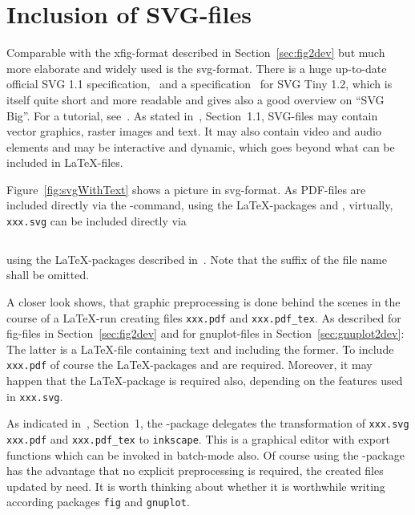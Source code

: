 \section{Inclusion of SVG-files}\label{sec:picSvg}

Comparable with the xfig-format described in Section~\ref{sec:fig2dev} 
but much more elaborate and widely used is the \gls{svg}-format. 
There is a huge up-to-date official SVG 1.1 specification,~\cite{Svg11} 
and a specification~\cite{Svg12Tiny} for SVG Tiny 1.2, 
which is itself quite short and more readable 
and gives also a good overview on ``SVG Big''. 
For a tutorial, see~\cite{SvgTut}. 
As stated in~\cite{Svg12Tiny}, Section~1.1, 
SVG-files may contain vector graphics, raster images and text. 
It may also contain video and audio elements 
and may be interactive and dynamic, 
which goes beyond what can be included in \LaTeX-files. 

Figure~\ref{fig:svgWithText} shows a picture in \gls{svg}-format. 
As PDF-files are included directly 
via the -command, 
using the \LaTeX-packages  and , 
virtually, 
\texttt{xxx.svg} can be included directly via 
\begin{lstlisting}[language=TeX]
%%
\end{lstlisting}
%
using the \LaTeX-packages  described in~\cite{SvgP}. 
Note that the suffix of the file name shall be omitted. 

A closer look shows, that graphic preprocessing is done behind the scenes 
in the course of a \LaTeX-run 
creating files \texttt{xxx.pdf} and \texttt{xxx.pdf\_tex}. 
As described for fig-files in Section~\ref{sec:fig2dev} 
and for gnuplot-files in Section~\ref{sec:gnuplot2dev}: 
The latter is a \LaTeX-file containing text 
and including the former. 
To include \texttt{xxx.pdf} 
of course the \LaTeX-packages  and  
are required. 
Moreover, it may happen that the \LaTeX-package  
is required also, depending on the features used in \texttt{xxx.svg}. 

As indicated in~\cite{SvgP}, Section~1, 
the -package delegates the transformation 
of \texttt{xxx.svg} \texttt{xxx.pdf} and \texttt{xxx.pdf\_tex} 
to \texttt{inkscape}. 
This is a graphical editor with export functions 
which can be invoked in batch-mode also. 
Of course using the -package has the advantage 
that no explicit preprocessing is required, 
the created files updated by need. 
It is worth thinking about whether it is worthwhile 
writing according packages \texttt{fig} and \texttt{gnuplot}. 

